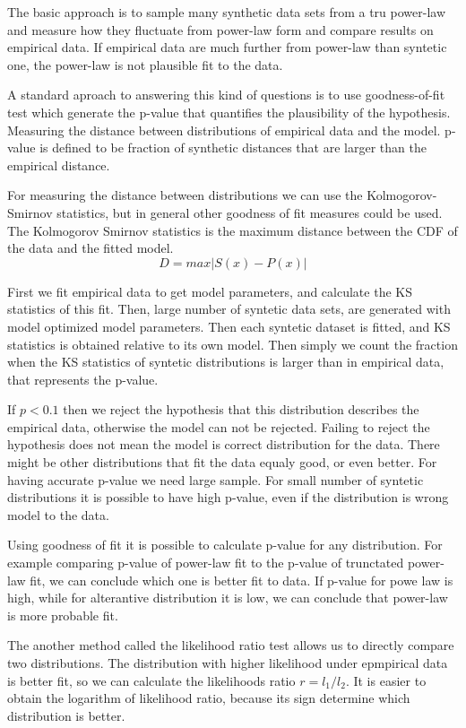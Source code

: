 The basic approach is to sample many synthetic data sets from a tru power-law and measure how they fluctuate from power-law form and compare results on empirical data. If empirical data are much further from power-law than syntetic one, the power-law is not plausible fit to the data. 


A standard aproach to answering this kind of questions is to use goodness-of-fit test which generate the p-value that quantifies the plausibility of the hypothesis. Measuring the distance between distributions of empirical data and the model. p-value is defined to be fraction of synthetic distances that are larger than the empirical distance. 

For measuring the distance between distributions we can use the Kolmogorov-Smirnov statistics, but in general other goodness of fit measures could be used.
The Kolmogorov Smirnov statistics is the maximum distance between the CDF of the data and the fitted model.  
\begin{equation}
D = max |S(x) - P(x)|
\end{equation}

First we fit empirical data to get model parameters, and calculate the KS statistics of this fit. Then, large number of syntetic data sets, are generated with model optimized model parameters. Then each syntetic dataset is fitted, and KS statistics is obtained relative to its own model. Then simply we count the fraction when the KS statistics of syntetic distributions is larger than in empirical data, that represents the p-value. 

If $p<0.1$ then we reject the hypothesis that this distribution describes the empirical data, otherwise the model can not be rejected. Failing to reject the hypothesis does not mean the model is correct distribution for the data. There might be other distributions that fit the data equaly good, or even better. For having accurate p-value we need large sample. For small number of syntetic distributions it is possible to have high p-value, even if the distribution is wrong model to the data. 

Using goodness of fit it is possible to calculate p-value for any distribution. For example comparing p-value of power-law fit to the p-value of trunctated power-law fit, we can conclude which one is better fit to data. If p-value for powe law is high, while for alterantive distribution it is low, we can conclude that power-law is more probable fit. 

The another method called the likelihood ratio test allows us to directly compare two distributions. The distribution with higher likelihood under epmpirical data is better fit, so we can calculate the likelihoods ratio $r=l_1/l_2$. It is easier to obtain the logarithm of likelihood ratio, because its sign determine which distribution is better. 

